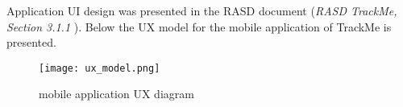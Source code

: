 \documentclass[../main.tex]{subfiles}
\begin{document}
Application UI design was presented in the RASD document (\textit{RASD TrackMe, Section 3.1.1  }).
Below the UX model for the mobile application of TrackMe is presented.
\begin{figure}[htpb]
	\texttt{[image: ux\_model.png]}
	\caption{mobile application UX diagram}
	\label{fig:ux_diagram}
\end{figure}
\thispagestyle{empty} %
\end{document}
